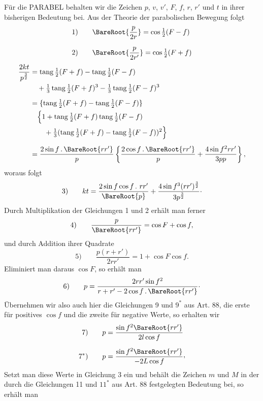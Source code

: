Für die PARABEL behalten wir die Zeichen $p$, $v$, $v'$, $F$, $f$, $r$, $r'$ und $t$ in ihrer bisherigen Bedeutung bei. Aus der Theorie der parabolischen Bewegung folgt
\[
\begin{aligned}
\mathrm{1)}\qquad&\BareRoot{\dfrac p{2r}}=\cos\tfrac12(F-f)\\[.7em]
\mathrm{2)}\qquad&\BareRoot{\dfrac p{2r'}}=\cos\tfrac12(F+f)
\end{aligned}
\]
\[
\begin{aligned}
\frac{2kt}{p^{\frac32}}&=\operatorname{tang}\tfrac12(F+f)-\operatorname{tang}\tfrac12(F-f)\\
&\quad+\tfrac13\operatorname{tang}\tfrac12(F+f)^3-\tfrac13\operatorname{tang}\tfrac12(F-f)^3\\[.5em]
&=\{\operatorname{tang}\tfrac12(F+f)-\operatorname{tang}\tfrac12(F-f)\}\\
&\quad\Bigl\{1+\operatorname{tang}\tfrac12(F+f)\operatorname{tang}\tfrac12(F-f)\\
&\qquad+\tfrac13(\operatorname{tang}\tfrac12(F+f)-\operatorname{tang}\tfrac12(F-f))^2\Bigr\}\\[.5em]
&=\frac{2\sin f\,\mathpunct{.}\BareRoot{rr'}}p
\left\{\frac{2\cos f\,\mathpunct{.}\BareRoot{rr'}}p+\frac{4\sin f^2rr'}{3pp}\right\},
\end{aligned}
\]
\noindent woraus folgt
\[
\mathrm{3)}\qquad kt=\frac{2\sin f\cos f\,\mathpunct{.}\,rr'}{\BareRoot{p}}+\frac{4\sin f^3(rr')^{\frac32}}{3p^{\frac32}}\mathpunct{\cdot}
\]
\noindent Durch Multiplikation der Gleichungen 1 und 2 erhält man ferner
\[
\mathrm{4)}\qquad \frac p{\BareRoot{rr'}}=\cos F+\cos f,
\]
\noindent und durch Addition ihrer Quadrate
\[
\mathrm{5)}\qquad \frac{p(r+r')}{2rr'}=1+\cos F\cos f.
\]
\noindent Eliminiert man daraus $\cos F$, so erhält man
\[
\mathrm{6)}\qquad p=\frac{2rr'\sin f^2}{r+r'-2\cos f\,\mathpunct{.}\BareRoot{rr'}}\mathpunct{\cdot}
\]
\noindent Übernehmen wir also auch hier die Gleichungen 9 und $9^*$ aus Art. 88, die erste für positives $\cos f$ und die zweite für negative Werte, so erhalten wir
\[
\begin{aligned}
\mathrm{7)}\qquad&p=\frac{\sin f^2\BareRoot{rr'}}{2l\cos f}\\[.6em]
\mathrm{7^*)}\qquad&p=\frac{\sin f^2\BareRoot{rr'}}{-2L\cos f}\mathpunct{\raisebox{.45ex}{,}}
\end{aligned}
\]
\noindent Setzt man diese Werte in Gleichung 3 ein und behält die Zeichen $m$ und $M$ in der durch die Gleichungen 11 und $11^*$ aus Art. 88 festgelegten Bedeutung bei, so erhält man
